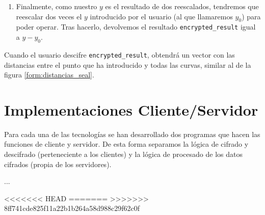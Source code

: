\begin{enumerate}
    \item Finalmente, como nuestro $y$ es el resultado de dos reescalados, tendremos que reescalar dos veces el $y$ introducido por el usuario (al que llamaremos $y_0$) para poder operar. Tras hacerlo, devolvemos el resultado \verb|encrypted_result| igual a $y - y_0$.

\end{enumerate}

Cuando el usuario descifre \verb|encrypted_result|, obtendrá un vector con las distancias entre el punto que ha introducido y todas las curvas, similar al de la figura \ref{form:distancias_seal}.


\section{Implementaciones Cliente/Servidor}

Para cada una de las tecnologías se han desarrollado dos programas que hacen las funciones de cliente y servidor. De esta forma separamos la lógica de cifrado y descifrado (perteneciente a los clientes) y la lógica de procesado de los datos cifrados (propia de los servidores).

...

<<<<<<< HEAD
=======
>>>>>>> 8ff741cde825f11a22b1b264a58d988c29f62c0f
